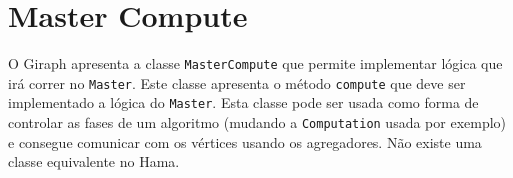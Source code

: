 %

%


\section*{Master Compute}

O Giraph apresenta a classe \texttt{MasterCompute} que permite implementar lógica que irá correr no \texttt{Master}. Este classe apresenta o método \texttt{compute} que deve ser implementado a lógica do \texttt{Master}. Esta classe pode ser usada como forma de controlar as fases de um algoritmo (mudando a \texttt{Computation} usada por exemplo) e consegue comunicar com os vértices usando os agregadores. Não existe uma classe equivalente no Hama.











%
